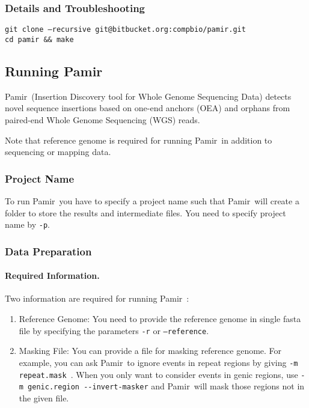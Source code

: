 \documentclass{article}
\makeatletter
\newcommand{\toolName}{Pamir~}
\newcommand{\gitClone}{git@bitbucket.org:compbio/pamir.git}
\makeatother
\begin{document}
\subsubsection{Details and Troubleshooting}
\begin{flushleft}
\texttt{git clone --recursive \gitClone}\\
\texttt{cd pamir \&\& make}
\end{flushleft}

\subsection{Running \toolName}
\toolName (Insertion Discovery tool for Whole Genome Sequencing Data) 
detects novel sequence insertions based on one-end anchors (OEA) and orphans from paired-end Whole Genome Sequencing (WGS) reads.

Note that reference genome is required for running \toolName in addition to sequencing or mapping data.

\subsubsection{Project Name}
To run \toolName you have to specify a project name such that \toolName will create a folder to store the results and intermediate files. You need to specify project name by \texttt{-p}. 


\subsubsection{Data Preparation}
\paragraph{Required Information.} Two information are required for running \toolName:
\begin{enumerate}
\item Reference Genome: You need to provide the reference genome in single fasta file by specifying the parameters \texttt{-r} or \texttt{--reference}.

\item Masking File: You can provide a file for masking reference genome. For example,  you can ask \toolName to ignore events in repeat regions by giving \texttt{-m repeat.mask }. When you only want to consider events in genic regions, use  \texttt{-m genic.region -{}-invert-masker} and \toolName will mask those regions not in the given file.

\end{enumerate}
\end{document}
